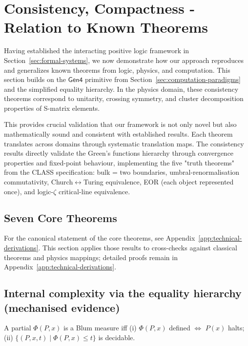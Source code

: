 \section{Consistency, Compactness - Relation to Known Theorems}
\label{sec:consistency}

Having established the interacting positive logic framework in Section~\ref{sec:formal-systems}, we now demonstrate how our approach reproduces and generalizes known theorems from logic, physics, and computation. This section builds on the $\mathsf{Gen4}$ primitive from Section~\ref{sec:computation-paradigms} and the simplified equality hierarchy. In the physics domain, these consistency theorems correspond to unitarity, crossing symmetry, and cluster decomposition properties of S-matrix elements.

This provides crucial validation that our framework is not only novel but also mathematically sound and consistent with established results. Each theorem translates across domains through systematic translation maps. The consistency results directly validate the Green's functions hierarchy through convergence properties and fixed-point behaviour, implementing the five "truth theorems" from the CLASS specification: bulk = two boundaries, umbral-renormalisation commutativity, Church$\leftrightarrow$Turing equivalence, EOR (each object represented once), and logic-$\zeta$ critical-line equivalence.

\subsection{Seven Core Theorems}

For the canonical statement of the core theorems, see Appendix~\ref{app:technical-derivations}. This section applies those results to cross-checks against classical theorems and physics mappings; detailed proofs remain in Appendix~\ref{app:technical-derivations}.

\subsection{Internal complexity via the equality hierarchy (mechanised evidence)}

\begin{definition}
A partial $\Phi(P,x)$ is a Blum measure iff
(i) $\Phi(P,x)$ defined $\Leftrightarrow$ $P(x)$ halts;
(ii) $\{(P,x,t)\mid \Phi(P,x)\le t\}$ is decidable.
\end{definition}

